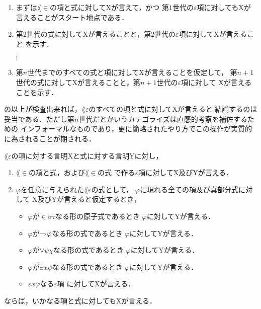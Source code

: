 	\begin{enumerate}
		\item まずは$\lang{\in}$の項と式に対してXが言えて，かつ
			第$1$世代の$\varepsilon$項に対してもXが言えることがスタート地点である．
		\item 第$2$世代の式に対してXが言えることと，第$2$世代の$\varepsilon$項に対してXが言えること
			を示す．
			
			$\vdots$
			
		\item 第$n$世代までのすべての式と項に対してXが言えることを仮定して，
			第$n+1$世代の式に対してXが言えることと，第$n+1$世代の$\varepsilon$項に対して
			Xが言えることを示す．
	\end{enumerate}
	の以上が検査出来れば，$\lang{\varepsilon}$のすべての項と式に対してXが言えると
	結論するのは妥当である．ただし第$n$世代だとかいうカテゴライズは直感的考察を補佐するための
	インフォーマルなものであり，更に簡略されたやり方でこの操作が実質的に為されることが期される．
	
	\begin{screen}
		\begin{metaaxm}
			$\lang{\varepsilon}$の項に対する言明Xと式に対する言明Yに対し，
			\begin{enumerate}
				\item $\lang{\in}$の項と式，および$\lang{\in}$の式
					で作る$\varepsilon$項に対してX及びYが言える．
				\item $\varphi$を任意に与えられた$\lang{\varepsilon}$の式として，
					$\varphi$に現れる全ての項及び真部分式に対して
					X及びYが言えると仮定するとき，
					\begin{itemize}
						\item $\varphi$が$\in \sigma \tau$なる形の原子式であるとき
							$\varphi$に対してYが言える．
						\item $\varphi$が$\rightharpoondown\hspace{-0.25em} \varphi$なる形の式であるとき
							$\varphi$に対してYが言える．
						\item $\varphi$が$\vee \psi \chi$なる形の式であるとき
							$\varphi$に対してYが言える．
						\item $\varphi$が$\exists x \psi$なる形の式であるとき
							$\varphi$に対してYが言える．
						\item $\varepsilon x \varphi$なる$\varepsilon$項
							に対してXが言える．
					\end{itemize}
			\end{enumerate}
			ならば，いかなる項と式に対してもXが言える．
		\end{metaaxm}
	\end{screen}
	
